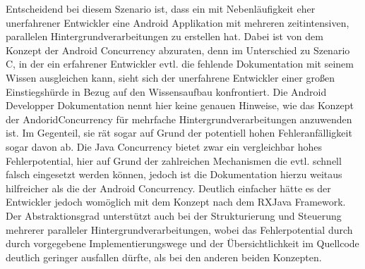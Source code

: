 \documentclass[12pt,oneside,a4paper,bibtotoc,liststotoc]{scrreprt}
\begin{document}
Entscheidend bei diesem Szenario ist, dass ein mit Nebenläufigkeit eher unerfahrener Entwickler eine Android Applikation mit mehreren zeitintensiven, parallelen Hintergrundverarbeitungen zu erstellen hat. Dabei ist von dem Konzept der Android Concurrency abzuraten, denn im Unterschied zu Szenario C, in der ein erfahrener Entwickler evtl. die fehlende Dokumentation mit seinem Wissen ausgleichen kann, sieht sich der unerfahrene Entwickler einer großen Einstiegshürde in Bezug auf den Wissensaufbau konfrontiert. Die Android Developper Dokumentation nennt hier keine genauen Hinweise, wie das Konzept der AndoridConcurrency für mehrfache Hintergrundverarbeitungen anzuwenden ist. Im Gegenteil, sie rät sogar auf Grund der potentiell hohen Fehleranfälligkeit sogar davon ab. Die Java Concurrency bietet zwar ein vergleichbar hohes Fehlerpotential, hier auf Grund der zahlreichen Mechanismen die evtl. schnell falsch eingesetzt werden können, jedoch ist die Dokumentation hierzu weitaus hilfreicher als die der Android Concurrency. Deutlich einfacher hätte es der Entwickler jedoch womöglich mit dem Konzept nach dem RXJava Framework. Der Abstraktionsgrad unterstützt auch bei der Strukturierung und Steuerung mehrerer paralleler Hintergrundverarbeitungen, wobei das Fehlerpotential durch durch vorgegebene Implementierungswege und der Übersichtlichkeit im Quellcode deutlich geringer ausfallen dürfte, als bei den anderen beiden Konzepten.
\end{document}
